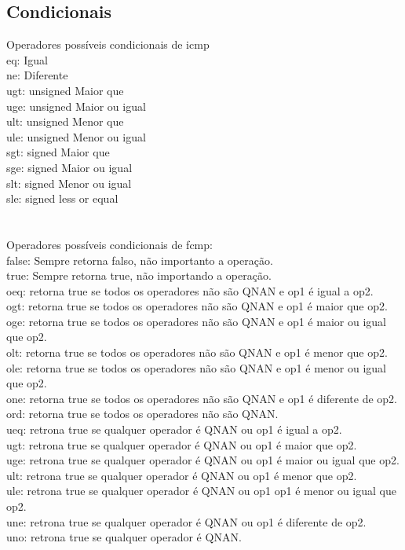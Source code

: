\documentclass[12pt,a4paper,twoside]{report}
\begin{document}
\subsection{Condicionais}
Operadores possíveis condicionais de icmp\\
eq: Igual\\
ne: Diferente\\
ugt: unsigned Maior que\\
uge: unsigned Maior ou igual\\
ult: unsigned Menor que\\
ule: unsigned Menor ou igual\\
sgt: signed Maior que\\
sge: signed Maior ou igual\\
slt: signed Menor ou igual\\
sle: signed less or equal\\
\\
\\
Operadores possíveis condicionais de fcmp:\\
false: Sempre retorna falso, não importanto a operação.\\
true: Sempre retorna true, não importando a operação.\\
oeq: retorna true se todos os operadores não são QNAN e op1 é igual a op2.\\
ogt: retorna true se todos os operadores não são QNAN e op1 é maior que op2.\\
oge: retorna true se todos os operadores não são QNAN e op1 é maior ou igual que op2.\\
olt: retorna true se todos os operadores não são QNAN e op1 é menor que op2.\\
ole: retorna true se todos os operadores não são QNAN e op1 é menor ou igual que op2.\\
one: retorna true se todos os operadores não são QNAN e op1 é diferente de op2.\\
ord: retorna true se todos os operadores não são QNAN.\\
ueq: retrona true se qualquer operador é QNAN ou op1 é igual a op2.\\
ugt: retrona true se qualquer operador é QNAN ou op1 é maior que op2.\\
uge: retrona true se qualquer operador é QNAN ou op1 é maior ou igual que op2.\\
ult: retrona true se qualquer operador é QNAN ou op1 é menor que op2.\\
ule: retrona true se qualquer operador é QNAN ou op1 op1 é menor ou igual que op2.\\
une: retrona true se qualquer operador é QNAN ou op1 é diferente de op2.\\
uno: retrona true se qualquer operador é QNAN.\\
\end{document}
